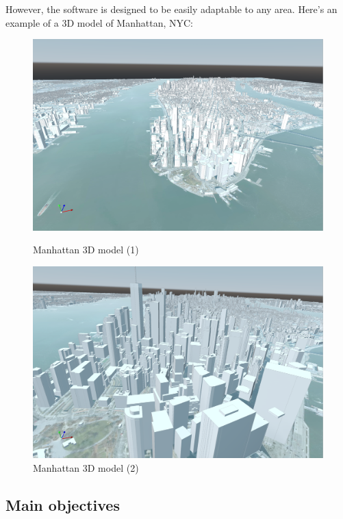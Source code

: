\documentclass[12pt]{article}
\begin{document}
However, the software is designed to be easily adaptable to any area.
Here's an example of a 3D model of Manhattan, NYC:

\begin{figure}[H]
    \centering
    \begin{minipage}{0.45\textwidth}
      \centering
      \includegraphics[width=1\textwidth]{images/mesh-manhattan-1.png}
      \caption{Manhattan 3D model (1)}
    \end{minipage}
    \begin{minipage}{0.45\textwidth}
      \centering
      \includegraphics[width=1\textwidth]{images/mesh-manhattan-2.png}
      \caption{Manhattan 3D model (2)}
    \end{minipage}
\end{figure}

\subsection{Main objectives}
\end{document}
